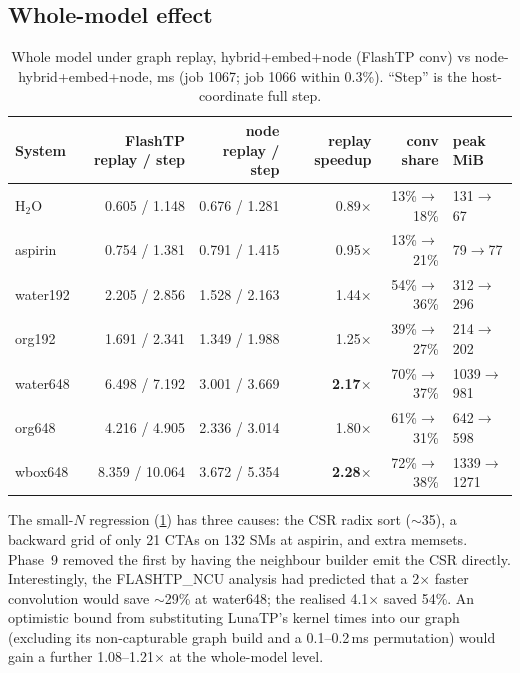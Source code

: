 \subsection{Whole-model effect}
\begin{table}[h]
\centering
\caption{Whole model under graph replay, hybrid+embed+node (FlashTP conv) vs node-hybrid+embed+node, ms (job 1067; job 1066 within 0.3\%). ``Step'' is the host-coordinate full step.}
\label{tab:node8}
\small
\begin{tabular}{lrrrrl}
\toprule
System & FlashTP replay / step & node replay / step & replay speedup & conv share & peak MiB \\
\midrule
H$_2$O & 0.605 / 1.148 & 0.676 / 1.281 & \textcolor{cbad}{0.89$\times$} & 13\%$\to$18\% & 131$\to$67 \\
aspirin & 0.754 / 1.381 & 0.791 / 1.415 & \textcolor{cbad}{0.95$\times$} & 13\%$\to$21\% & 79$\to$77 \\
water192 & 2.205 / 2.856 & 1.528 / 2.163 & 1.44$\times$ & 54\%$\to$36\% & 312$\to$296 \\
org192 & 1.691 / 2.341 & 1.349 / 1.988 & 1.25$\times$ & 39\%$\to$27\% & 214$\to$202 \\
water648 & 6.498 / 7.192 & 3.001 / 3.669 & \textbf{2.17$\times$} & 70\%$\to$37\% & 1039$\to$981 \\
org648 & 4.216 / 4.905 & 2.336 / 3.014 & 1.80$\times$ & 61\%$\to$31\% & 642$\to$598 \\
wbox648 & 8.359 / 10.064 & 3.672 / 5.354 & \textbf{2.28$\times$} & 72\%$\to$38\% & 1339$\to$1271 \\
\bottomrule
\end{tabular}
\end{table}

The small-$N$ regression (\cref{tab:node8}) has three causes: the CSR radix sort ($\sim$35\us), a backward grid of only 21 CTAs on 132 SMs at aspirin, and extra memsets. Phase~9 removed the first by having the neighbour builder emit the CSR directly. Interestingly, the FLASHTP\_NCU analysis had predicted that a 2$\times$ faster convolution would save $\sim$29\% at water648; the realised 4.1$\times$ saved 54\%. An optimistic bound from substituting LunaTP's kernel times into our graph (excluding its non-capturable graph build and a 0.1--0.2\,ms permutation) would gain a further 1.08--1.21$\times$ at the whole-model level.
